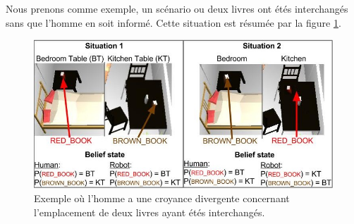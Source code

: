 \documentclass[a4paper,11pt,twoside]{StyleThese}
\begin{document}
Nous prenons comme exemple, un scénario ou deux livres ont étés interchangés sans que l'homme en soit informé.
Cette situation est résumée par la figure \ref{fig:dbexemple}.

\begin{figure}[ht!]
 \centering
  \includegraphics[width=0.89\linewidth]{./img/dbexemple.jpg} 
  \caption {Exemple où l'homme a une croyance divergente concernant l'emplacement de deux livres ayant étés interchangés.}
  \label{fig:dbexemple}
\end{figure}
\end{document}

